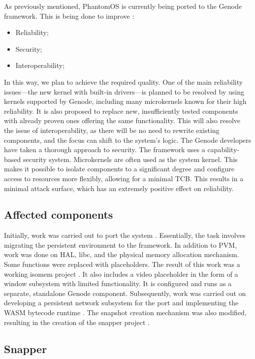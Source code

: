 As previously mentioned, PhantomOS is currently being ported to the Genode framework. This is being done to improve \cite{Antonov_Anton}:
\begin{itemize}
    \item Reliability;
    \item Security;
    \item Interoperability;
\end{itemize}
In this way, we plan to achieve the required quality. One of the main reliability issues—the new kernel with built-in drivers—is planned to be resolved by using kernels supported by Genode, including many microkernels known for their high reliability. It is also proposed to replace new, insufficiently tested components with already proven ones offering the same functionality. This will also resolve the issue of interoperability, as there will be no need to rewrite existing components, and the focus can shift to the system’s logic. The Genode developers have taken a thorough approach to security. The framework uses a capability-based security system. Microkernels are often used as the system kernel. This makes it possible to isolate components to a significant degree and configure access to resources more flexibly, allowing for a minimal TCB. This results in a minimal attack surface, which has an extremely positive effect on reliability.

\subsection{Affected components}

Initially, work was carried out to port the system \cite{Antonov_Anton}. Essentially, the task involves migrating the persistent environment to the framework. In addition to PVM, work was done on HAL, libc, and the physical memory allocation mechanism. Some functions were replaced with placeholders. The result of this work was a working isomem project \cite{GitHub_isomem}. It also includes a video placeholder in the form of a window subsystem with limited functionality. It is configured and runs as a separate, standalone Genode component. Subsequently, work was carried out on developing a persistent network subsystem for the \cite{Brisilin_Anton} port and implementing the WASM bytecode runtime \cite{Samburskiy_Kirill}. The snapshot creation mechanism was also modified, resulting in the creation of the snapper project \cite{GitHub_Snapper}.

\subsection{Snapper}

